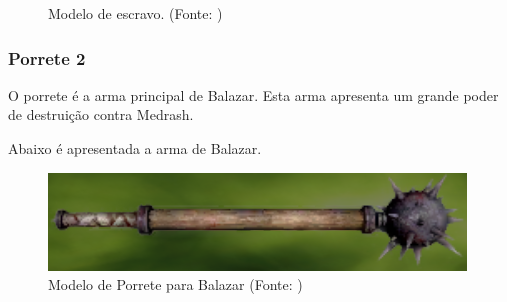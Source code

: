 \begin{itemize}
\begin{figure}[H]
 \caption{Modelo de escravo. (Fonte: \cite{bib:escravo01})}
\label{img:escrava}
\end{figure}
\end{itemize}
\subsubsection{Porrete 2}
O porrete é a arma principal de Balazar. Esta arma apresenta um grande poder de destruição contra Medrash.

Abaixo é apresentada a arma de Balazar.

\begin{figure}[H]
 \centering
 \includegraphics[scale=1]{Imagens/porrete02.png}
 \caption{Modelo de Porrete para Balazar (Fonte: \cite{bib:jogoinfinity})}
\label{img:porrete02}
\end{figure}